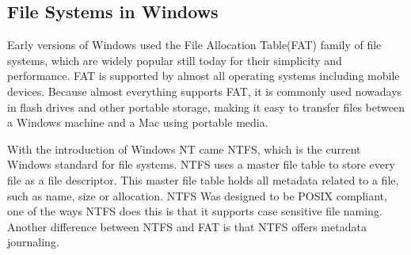 \documentclass[10pt,serif,draftclsnofoot,onecolumn]{IEEEtran}
\begin{document}
	\subsection{File Systems in Windows}
	\par
			Early versions of Windows used the File Allocation Table(FAT) family of file systems, which are widely popular still today for their simplicity and performance\cite{18}. FAT is supported by almost all operating systems including mobile devices. Because almost everything supports FAT, it is commonly used nowadays in flash drives and other portable storage, making it easy to transfer files between a Windows machine and a Mac using portable media. 
	\newline
	\par
			With the introduction of Windows NT came NTFS, which is the current Windows standard for file systems\cite{18}. NTFS uses a master file table to store every file as a file descriptor. This master file table holds all metadata related to a file, such as name, size or allocation\cite{18}. NTFS Was designed to be POSIX compliant, one of the ways NTFS does this is that it supports case sensitive file naming\cite{19}. Another difference between NTFS and FAT is that NTFS offers metadata journaling.
	\newline
\end{document}
